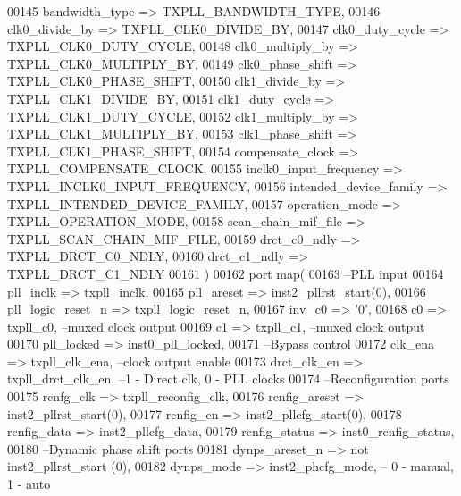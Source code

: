 \begin{DoxyCode}
00145       bandwidth_type          => TXPLL_BANDWIDTH_TYPE,
00146       clk0_divide_by          => TXPLL_CLK0_DIVIDE_BY,
00147       clk0_duty_cycle         => TXPLL_CLK0_DUTY_CYCLE,
00148       clk0_multiply_by        => TXPLL_CLK0_MULTIPLY_BY,
00149       clk0_phase_shift        => TXPLL_CLK0_PHASE_SHIFT,
00150       clk1_divide_by          => TXPLL_CLK1_DIVIDE_BY,
00151       clk1_duty_cycle         => TXPLL_CLK1_DUTY_CYCLE,
00152       clk1_multiply_by        => TXPLL_CLK1_MULTIPLY_BY,
00153       clk1_phase_shift        => TXPLL_CLK1_PHASE_SHIFT,
00154       compensate_clock        => TXPLL_COMPENSATE_CLOCK,
00155       inclk0_input_frequency  => TXPLL_INCLK0_INPUT_FREQUENCY,
00156       intended_device_family  => TXPLL_INTENDED_DEVICE_FAMILY,
00157       operation_mode          => TXPLL_OPERATION_MODE,
00158       scan_chain_mif_file     => TXPLL_SCAN_CHAIN_MIF_FILE,
00159       drct_c0_ndly            => TXPLL_DRCT_C0_NDLY,
00160       drct_c1_ndly            => TXPLL_DRCT_C1_NDLY
00161    \textcolor{vhdlchar}{)}
00162    \textcolor{keywordflow}{port} \textcolor{keywordflow}{map}(
00163 \textcolor{keyword}{   --PLL input }
00164    pll_inclk         => txpll_inclk,
00165    pll_areset        => inst2_pllrst_start\textcolor{vhdlchar}{(}\textcolor{vhdllogic}{0}\textcolor{vhdlchar}{)},
00166    pll_logic_reset_n => txpll_logic_reset_n,
00167    inv_c0            => '0',
00168    c0                => txpll_c0,\textcolor{keyword}{ --muxed clock output}
00169    c1                => txpll_c1,\textcolor{keyword}{ --muxed clock output}
00170    pll_locked        => inst0_pll_locked,
00171 \textcolor{keyword}{   --Bypass control}
00172    clk_ena           => txpll_clk_ena,\textcolor{keyword}{       --clock output enable}
00173    drct_clk_en       => txpll_drct_clk_en,\textcolor{keyword}{   --1 - Direct clk, 0 - PLL clocks }
00174 \textcolor{keyword}{   --Reconfiguration ports}
00175    rcnfg_clk         => txpll_reconfig_clk,
00176    rcnfig_areset     => inst2_pllrst_start\textcolor{vhdlchar}{(}\textcolor{vhdllogic}{0}\textcolor{vhdlchar}{)},
00177    rcnfig_en         => inst2_pllcfg_start\textcolor{vhdlchar}{(}\textcolor{vhdllogic}{0}\textcolor{vhdlchar}{)},
00178    rcnfig_data       => inst2_pllcfg_data,
00179    rcnfig_status     => inst0_rcnfig_status,
00180 \textcolor{keyword}{   --Dynamic phase shift ports}
00181    dynps_areset_n    => \textcolor{keywordflow}{not} inst2\_pllrst\_start \textcolor{vhdlchar}{(}\textcolor{vhdllogic}{0}\textcolor{vhdlchar}{)},
00182    dynps_mode        => inst2_phcfg_mode,\textcolor{keyword}{ -- 0 - manual, 1 - auto}

\end{DoxyCode}
